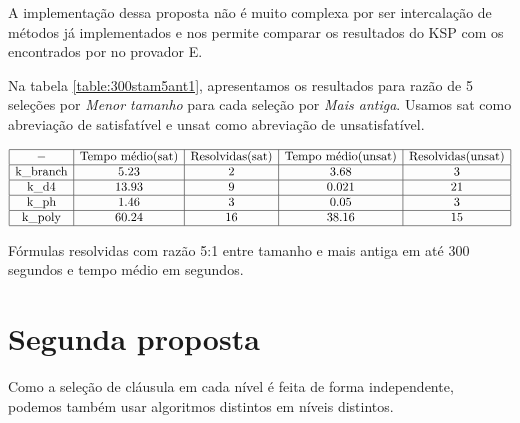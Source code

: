 A implementação dessa proposta não é muito complexa por ser intercalação de métodos já implementados e nos permite comparar os resultados do KSP com os encontrados por \cite{stephan} no provador E.


Na tabela \ref{table:300stam5ant1}, apresentamos os resultados para razão de 5 seleções por \textit{Menor tamanho} para cada seleção por \textit{Mais antiga}. Usamos sat como abreviação de satisfatível e unsat como abreviação de unsatisfatível.
\begin{table*}[t]
	\[
\begin{array}{|c|c|c|c|c|}
	\hline - & \textnormal{Tempo médio(sat)} & \textnormal{Resolvidas(sat)} & \textnormal{Tempo médio(unsat)} & \textnormal{Resolvidas(unsat)} \\
	
	\hline \textnormal{k\_branch} & 5.23 & 2 & 3.68 & 3 \\
	\hline \textnormal{k\_d4} & 13.93 & 9 & 0.021 & 21 \\
	\hline \textnormal{k\_ph} & 1.46 & 3 & 0.05 & 3 \\
	\hline \textnormal{k\_poly} & 60.24 & 16 & 38.16 & 15 \\
	
	\hline
	
\end{array}
	\]
\caption{Fórmulas resolvidas com razão 5:1 entre tamanho e mais antiga em até 300 segundos e tempo médio em segundos.}
\label{table:300stam5ant1}
\end{table*} %

\section{Segunda proposta}
Como a seleção de cláusula em cada nível é feita de forma independente, podemos também usar algoritmos distintos em níveis distintos.

